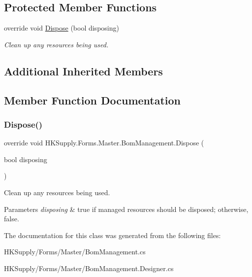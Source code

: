 \subsection*{Protected Member Functions}
\begin{DoxyCompactItemize}
\item 
override void \mbox{\hyperlink{class_h_k_supply_1_1_forms_1_1_master_1_1_bom_management_a9e3b98419ea709301213557e1ae996cc}{Dispose}} (bool disposing)
\begin{DoxyCompactList}\small\item\em Clean up any resources being used. \end{DoxyCompactList}\end{DoxyCompactItemize}
\subsection*{Additional Inherited Members}


\subsection{Member Function Documentation}
\mbox{\label{class_h_k_supply_1_1_forms_1_1_master_1_1_bom_management_a9e3b98419ea709301213557e1ae996cc}} 
\subsubsection{\texorpdfstring{Dispose()}{Dispose()}}
{\footnotesize\ttfamily override void H\+K\+Supply.\+Forms.\+Master.\+Bom\+Management.\+Dispose (\begin{DoxyParamCaption}\item[{bool}]{disposing }\end{DoxyParamCaption})\hspace{0.3cm}{\ttfamily [protected]}}



Clean up any resources being used. 


\begin{DoxyParams}{Parameters}
{\em disposing} & true if managed resources should be disposed; otherwise, false.\\
\hline
\end{DoxyParams}


The documentation for this class was generated from the following files\+:\begin{DoxyCompactItemize}
\item 
H\+K\+Supply/\+Forms/\+Master/Bom\+Management.\+cs\item 
H\+K\+Supply/\+Forms/\+Master/Bom\+Management.\+Designer.\+cs\end{DoxyCompactItemize}
